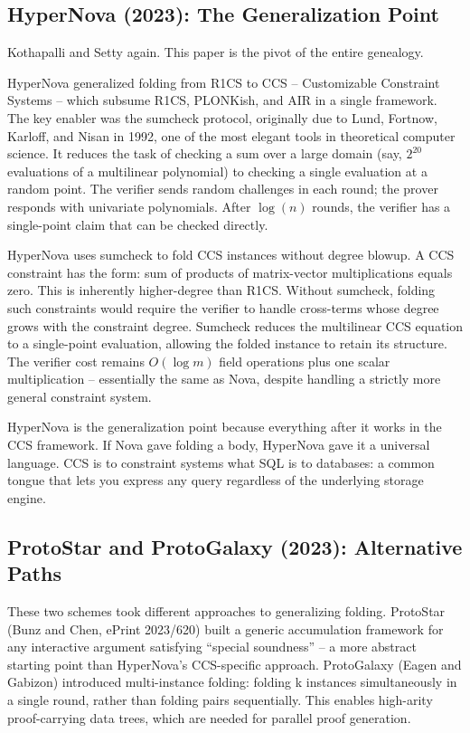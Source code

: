 \documentclass[
  11pt,
  openany]{report}
\begin{document}
\subsection{HyperNova (2023): The Generalization
Point}\label{hypernova-2023-the-generalization-point}

Kothapalli and Setty again. This paper is the pivot of the entire genealogy.

HyperNova generalized folding from R1CS to CCS -- Customizable Constraint
Systems -- which subsume R1CS, PLONKish, and AIR in a single framework. The key
enabler was the sumcheck protocol, originally due to Lund, Fortnow, Karloff, and
Nisan in 1992, one of the most elegant tools in theoretical computer science. It
reduces the task of checking a sum over a large domain (say, \(2^{20}\)
evaluations of a multilinear polynomial) to checking a single evaluation at a
random point. The verifier sends random challenges in each round; the prover
responds with univariate polynomials. After \(\log(n)\) rounds, the verifier has
a single-point claim that can be checked directly.

HyperNova uses sumcheck to fold CCS instances without degree blowup. A CCS
constraint has the form: sum of products of matrix-vector multiplications equals
zero. This is inherently higher-degree than R1CS. Without sumcheck, folding such
constraints would require the verifier to handle cross-terms whose degree grows
with the constraint degree. Sumcheck reduces the multilinear CCS equation to a
single-point evaluation, allowing the folded instance to retain its structure.
The verifier cost remains \(O(\log m)\) field operations plus one scalar
multiplication -- essentially the same as Nova, despite handling a strictly more
general constraint system.

HyperNova is the generalization point because everything after it works in the
CCS framework. If Nova gave folding a body, HyperNova gave it a universal
language. CCS is to constraint systems what SQL is to databases: a common tongue
that lets you express any query regardless of the underlying storage engine.

\subsection{ProtoStar and ProtoGalaxy (2023): Alternative
Paths}\label{protostar-and-protogalaxy-2023-alternative-paths}

These two schemes took different approaches to generalizing folding. ProtoStar
(Bunz and Chen, ePrint 2023/620) built a generic accumulation framework for any
interactive argument satisfying ``special soundness'' -- a more abstract
starting point than HyperNova's CCS-specific approach. ProtoGalaxy (Eagen and
Gabizon) introduced multi-instance folding: folding k instances simultaneously
in a single round, rather than folding pairs sequentially. This enables
high-arity proof-carrying data trees, which are needed for parallel proof
generation.
\end{document}
